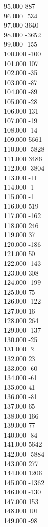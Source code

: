 { 95.000	887 \\
 96.000	-534 \\
 97.000	3640 \\
 98.000	-3652 \\
 99.000	-155 \\
 100.000	-100 \\
 101.000	107 \\
 102.000	-35 \\
 103.000	-87 \\
 104.000	-89 \\
 105.000	-28 \\
 106.000	131 \\
 107.000	-19 \\
 108.000	-14 \\
 109.000	5661 \\
 110.000	-5828 \\
 111.000	3486 \\
 112.000	-3804 \\
 113.000	-11 \\
 114.000	-1 \\
 115.000	-1 \\
 116.000	519 \\
 117.000	-162 \\
 118.000	246 \\
 119.000	37 \\
 120.000	-186 \\
 121.000	50 \\
 122.000	-143 \\
 123.000	308 \\
 124.000	-199 \\
 125.000	75 \\
 126.000	-122 \\
 127.000	16 \\
 128.000	264 \\
 129.000	-137 \\
 130.000	-25 \\
 131.000	-2 \\
 132.000	23 \\
 133.000	-60 \\
 134.000	-61 \\
 135.000	41 \\
 136.000	-81 \\
 137.000	65 \\
 138.000	166 \\
 139.000	77 \\
 140.000	-84 \\
 141.000	5642 \\
 142.000	-5884 \\
 143.000	277 \\
 144.000	1206 \\
 145.000	-1362 \\
 146.000	-130 \\
 147.000	153 \\
 148.000	101 \\
 149.000	-98 \\
}
